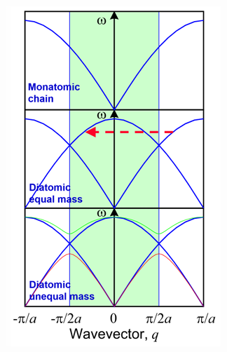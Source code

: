 \documentclass{article}
\theoremstyle{remark}
\theoremstyle{remark}
\begin{document}
\begin{enumerate}
\begin{minipage}{0.23\linewidth}
\begin{center}
                \includegraphics*[width=1.2\linewidth]{cmp_diatomic_backfolding.png}
            \end{center}
        \end{minipage}


\end{enumerate}
\end{document}

